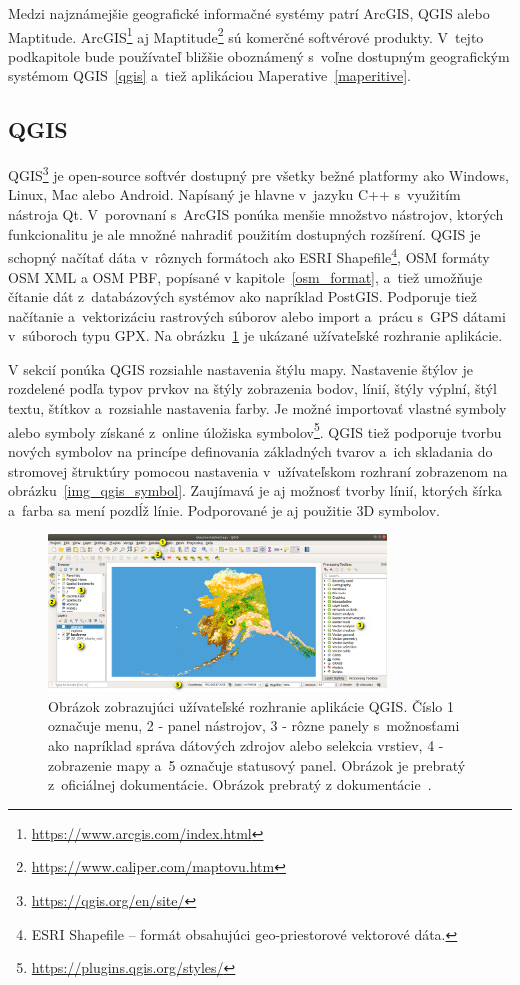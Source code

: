 Medzi najznámejšie geografické informačné systémy patrí ArcGIS, QGIS alebo Maptitude. ArcGIS\footnote{\url{https://www.arcgis.com/index.html}} aj Maptitude\footnote{\url{https://www.caliper.com/maptovu.htm}} sú komerčné softvérové produkty. V~tejto podkapitole bude používateľ bližšie oboznámený s~voľne dostupným geografickým systémom QGIS~\ref{qgis} a~tiež aplikáciou Maperative~\ref{maperitive}.

\subsection*{QGIS}
\label{qgis}
QGIS\footnote{\url{https://qgis.org/en/site/}} je open-source softvér dostupný pre všetky bežné platformy ako Windows, Linux, Mac alebo Android. Napísaný je hlavne v~jazyku C++ s~využitím nástroja Qt. V~porovnaní s~ArcGIS ponúka menšie množstvo nástrojov, ktorých funkcionalitu je ale množné nahradiť použitím dostupných rozšírení. QGIS je schopný načítať dáta v~rôznych formátoch ako ESRI Shapefile\footnote{ESRI Shapefile -- formát obsahujúci geo-priestorové vektorové dáta.}, OSM formáty OSM XML a OSM PBF, popísané v kapitole~\ref{osm_format}, a~tiež umožňuje čítanie dát z~databázových systémov ako napríklad PostGIS. Podporuje tiež načítanie a~vektorizáciu rastrových súborov alebo import a~prácu s~GPS dátami v~súboroch typu GPX. Na obrázku~\ref{img_qgis_ui} je ukázané užívateľské rozhranie aplikácie.

V sekcií  ponúka QGIS rozsiahle nastavenia štýlu mapy. Nastavenie štýlov je rozdelené podľa typov prvkov na štýly zobrazenia bodov, línií, štýly výplní, štýl textu, štítkov a~rozsiahle nastavenia farby. Je možné importovať vlastné symboly alebo symboly získané z~online úložiska symbolov\footnote{\url{https://plugins.qgis.org/styles/}}. QGIS tiež podporuje tvorbu nových symbolov na princípe definovania základných tvarov a~ich skladania do stromovej štruktúry pomocou nastavenia v~užívateľskom rozhraní zobrazenom na obrázku~\ref{img_qgis_symbol}. Zaujímavá je aj možnosť tvorby línií, ktorých šírka a~farba sa mení pozdĺž línie. Podporované je aj použitie 3D symbolov.~\cite{qgis}


\begin{figure}[hbt]
	\centering
	\includegraphics[width=0.8\textwidth]{obrazky-figures/qgis.png}
	\caption{Obrázok zobrazujúci užívateľské rozhranie aplikácie QGIS. Číslo 1 označuje menu, 2 - panel nástrojov, 3 - rôzne panely s~možnosťami ako napríklad správa dátových zdrojov alebo selekcia vrstiev, 4 - zobrazenie mapy a~5 označuje statusový panel. Obrázok je prebratý z~oficiálnej dokumentácie. Obrázok prebratý z dokumentácie~\cite{qgis_img_1}.}
	\label{img_qgis_ui}
\end{figure}

